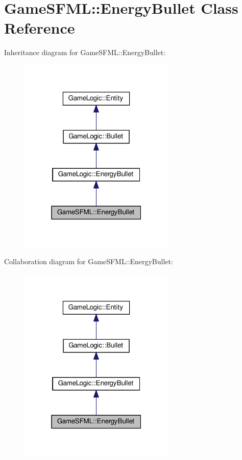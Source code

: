 \hypertarget{classGameSFML_1_1EnergyBullet}{}\section{Game\+S\+F\+ML\+:\+:Energy\+Bullet Class Reference}
\label{classGameSFML_1_1EnergyBullet}


Inheritance diagram for Game\+S\+F\+ML\+:\+:Energy\+Bullet\+:
\nopagebreak
\begin{figure}[H]
\begin{center}
\leavevmode
\includegraphics[width=211pt]{classGameSFML_1_1EnergyBullet__inherit__graph}
\end{center}
\end{figure}


Collaboration diagram for Game\+S\+F\+ML\+:\+:Energy\+Bullet\+:
\nopagebreak
\begin{figure}[H]
\begin{center}
\leavevmode
\includegraphics[width=211pt]{classGameSFML_1_1EnergyBullet__coll__graph}
\end{center}
\end{figure}
